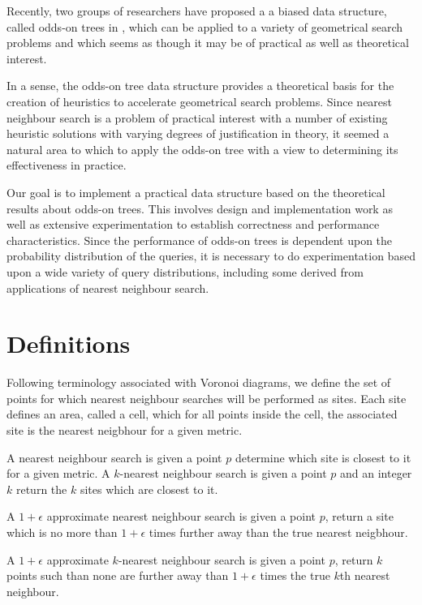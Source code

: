 \documentclass[mcs]{scsthesis}
\begin{document}
Recently, two groups of researchers \cite{chan} \cite{oddson} have proposed a
a biased data structure, called odds-on trees in \cite{oddson},  which can be
applied to a variety of geometrical search problems and which seems as though it
may be of practical as well as theoretical interest.

In a sense, the odds-on tree data structure provides a theoretical basis for
the creation of heuristics to accelerate geometrical search problems. Since
nearest neighbour search is a problem of practical interest with a number of
existing heuristic solutions with varying degrees of justification in theory,
it seemed a natural area to which to apply the odds-on tree with a view to
determining its effectiveness in practice.

Our goal is to implement a practical data structure based on the theoretical
results about odds-on trees.  This involves design and implementation work as
well as extensive experimentation to establish correctness and performance
characteristics. Since the performance of odds-on trees is dependent upon the
probability distribution of the queries, it is necessary to do experimentation
based upon a wide variety of query distributions, including some derived from
applications of nearest neighbour search.

\section{Definitions}

Following terminology associated with Voronoi diagrams, we define the set of
points for which nearest neighbour searches will be performed as sites. Each
site defines an area, called a cell, which for all points inside the cell, the
associated site is the nearest neigbhour for a given metric.

A nearest neighbour search is given a point \(p\) determine which site is
closest to it for a given metric. A \(k\)-nearest neighbour search is given a
point \(p\) and an integer \(k\) return the \(k\) sites which are closest to it. 

A \(1 + \epsilon\) approximate nearest neighbour search is given a point \(p\),
return a site which is no more than \(1 + \epsilon\) times further away than
the true nearest neigbhour.

A \(1 + \epsilon\) approximate \(k\)-nearest neighbour search is given a point
\(p\), return \(k\) points such than none are further away than \(1 + \epsilon\)
times the true \(k\)th nearest neighbour.
\end{document}
